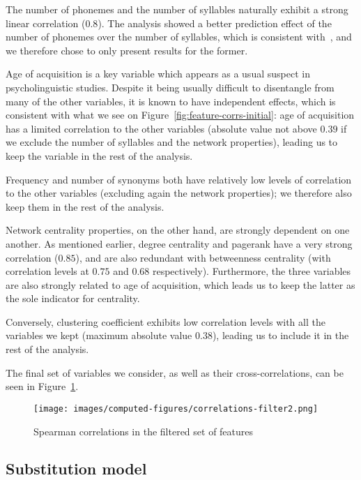 The number of phonemes and the number of syllables naturally exhibit a strong linear correlation ($0.8$).
The analysis showed a better prediction effect of the number of phonemes over the number of syllables, which is consistent with~\citet{nick-diss}, and we therefore chose to only present results for the former.

Age of acquisition is a key variable which appears as a usual suspect in psycholinguistic studies.
Despite it being usually difficult to disentangle from many of the other variables, it is known to have independent effects, which is consistent with what we see on Figure~\ref{fig:feature-corrs-initial}: age of acquisition has a limited correlation to the other variables (absolute value not above $0.39$ if we exclude the number of syllables and the network properties), leading us to keep the variable in the rest of the analysis.

Frequency and number of synonyms both have relatively low levels of correlation to the other variables (excluding again the network properties); we therefore also keep them in the rest of the analysis.

\bigskip
Network centrality properties, on the other hand, are strongly dependent on one another.
As mentioned earlier, degree centrality and pagerank have a very strong correlation ($0.85$), and are also redundant with betweenness centrality (with correlation levels at $0.75$ and $0.68$ respectively).
Furthermore, the three variables are also strongly related to age of acquisition, which leads us to keep the latter as the sole indicator for centrality.

Conversely, clustering coefficient exhibits low correlation levels with all the variables we kept (maximum absolute value $0.38$), leading us to include it in the rest of the analysis.

The final set of variables we consider, as well as their cross-correlations, can be seen in Figure~\ref{fig:feature-corrs-filtered}.

\begin{figure}[!th]
    \centering
    \texttt{[image: images/computed-figures/correlations-filter2.png]}
    \caption{Spearman correlations in the filtered set of features}
    \label{fig:feature-corrs-filtered}
\end{figure}


\subsection{Substitution model}

